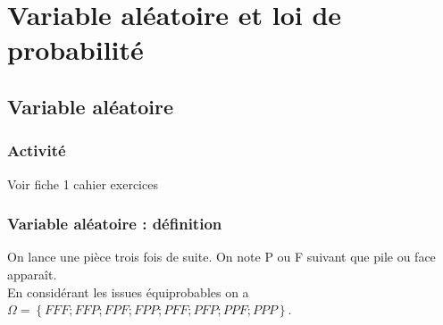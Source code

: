 \documentclass[10pt,a4paper]{article}
\theoremstyle{break}
\begin{document}
\section{Variable aléatoire et loi de probabilité}
\subsection{Variable aléatoire} 
\subsubsection{Activité}

Voir fiche 1 cahier exercices

\subsubsection{Variable aléatoire : définition}
\noindent On lance une pièce trois fois de suite. On note P ou F suivant que \og pile \fg{} ou \og face \fg{} apparaît.\\
En considérant les issues équiprobables on a $\Omega=\left\lbrace FFF ; FFP ; FPF ; FPP ; PFF ; PFP ; PPF ; PPP\right\rbrace $.
\end{document}
